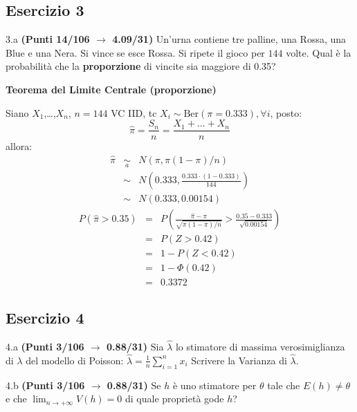 \documentclass[
  11pt,
]{book}
\theoremstyle{mytheoremstyle}
\theoremstyle{mydefstyle}
\newenvironment{sol}
  {
  \begin{tcolorbox}[enhanced,breakable,arc=0.1mm,boxrule=1pt,colback=white,colframe=iblue,
  title=\bf \fontfamily{lmss}\selectfont \hspace{.5 cm} Soluzione,drop fuzzy shadow]

}{
\end{tcolorbox}
  }
\begin{document}
\subsection{Esercizio 3}\label{esercizio-3-16}

3.a \textbf{(Punti 14/106 \(\rightarrow\) 4.09/31)} Un'urna contiene tre palline, una Rossa, una Blue e una Nera. Si vince
se esce Rossa. Si ripete il gioco per \(144\) volte. Qual è la probabilità che la
\textbf{proporzione} di vincite sia maggiore di 0.35?

\begin{sol}
\textbf{Teorema del Limite Centrale (proporzione)}

Siano \(X_1\),\ldots,\(X_n\), \(n=144\) VC IID, tc \(X_i\sim\text{Ber}(\pi=0.333)\)\(,\forall i\), posto:
\[
      \hat\pi=\frac{S_n}n = \frac{X_1 + ... + X_n}n
      \]
allora:\begin{eqnarray*}
  \hat\pi & \mathop{\sim}\limits_{a}& N(\pi,\pi(1-\pi)/n) \\
  &\sim & N\left(0.333,\frac{0.333\cdot(1-0.333)}{144}\right) \\
     &\sim & N(0.333,0.00154) 
  \end{eqnarray*}\begin{eqnarray*}
      P( \hat\pi   >   0.35 ) 
        &=& P\left(  \frac { \hat\pi  -  \pi }{ \sqrt{\pi(1-\pi)/n} }  >  \frac { 0.35  -  0.333 }{\sqrt{ 0.00154 }} \right)  \\
                 &=& P\left(  Z   >   0.42 \right) \\    &=& 1-P(Z< 0.42 )\\ 
                 &=&  1-\Phi( 0.42 ) \\ &=&  0.3372 
      \end{eqnarray*}

\end{sol}

\subsection{Esercizio 4}\label{esercizio-4-16}

4.a \textbf{(Punti 3/106 \(\rightarrow\) 0.88/31)} Sia \(\hat \lambda\) lo stimatore di massima verosimiglianza di \(\lambda\) del modello di Poisson: \(\hat\lambda =  \frac 1n\sum_{i=1}^nx_i\)
Scrivere la Varianza di \(\hat \lambda\).

4.b \textbf{(Punti 3/106 \(\rightarrow\) 0.88/31)} Se \(h\) è uno stimatore per \(\theta\) tale che
\(E(h)\ne \theta\) e che \(\lim_ {n\to +\infty}V(h)=0\) di quale proprietà gode \(h\)?
\end{document}
